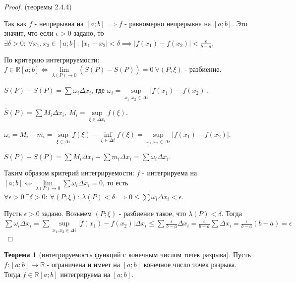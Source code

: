 \documentclass{report}
\theoremstyle{definition}
\newtheorem{theorem}{Теорема}[section]
\begin{document}
\begin{proof}
  (теоремы 2.4.4)

  Так как $f$ - непрерывна на $[a;b]\implies f$ - равномерно непрерывна на $[a;b]$. Это значит,
  что если $\epsilon>0$ задано, то $\exists\delta>0: \ \forall x_{1},x_{2}\in [a;b]: \
    | x_{1} - x_{2} | < \delta \implies | f(x_{1}) - f(x_{2}) | < \frac{\epsilon}{b - a}$.

  По критерию интегрируемости: $f\in\mathbb{R}[a;b] \iff \underset{\lambda(P)\rightarrow0}{\lim}
    (\overline{S}(P) - \underline{S}(P)) = 0 \ \forall (P;\xi)$ - разбиение.

  $\overline{S}(P) - \underline{S}(P) = \sum\omega_{i}\Delta x_{i}$, где $\omega_{i} = \underset
    {x_{1},x_{2}\in\Delta i}{\sup} | f(x_{1}) - f(x_{2}) |$.

  $\overline{S}(P) = \sum M_{i}\Delta x_{i}, \ M_{i} = \underset{\xi\in\Delta x_{i}}{\sup}f(\xi)$.

  $\omega_{i} = M_{i} - m_{i} = \underset{\xi\in\Delta i}{\sup}f(\xi) - \underset{\xi\in\Delta i}
    {\inf}f(\xi) = \underset{x_{1},x_{2}\in\Delta i}{\sup}| f(x_{1}) - f(x_{2}) |$.

  $\overline{S}(P) - \underline{S}(P) = \sum M_{i}\Delta x_{i} - \sum m_{i}\Delta x_{i} =
    \sum \omega_{i}\Delta x_{i}$.

  Таким образом критерий интегрируемости: $f$ - интегрируема на $[a;b] \iff \underset{\lambda
      (P)\rightarrow0}{\lim}\sum\omega_{i}\Delta x_{i} = 0$, то есть $\forall \epsilon > 0 \
    \exists \delta > 0: \ \forall (P;\xi): \ \lambda(P)<\delta\implies 0 \leqslant\sum\omega_{i}
    \Delta x_{i} < \epsilon$.

  Пусть $\epsilon > 0$ задано. Возьмем $(P;\xi)$ - разбиение такое, что $\lambda(P) < \delta$.
  Тогда $\sum\omega_{i}\Delta x_{i} = \sum \underset{x_{1},x_{2}\in\Delta i}{\sup}
    | f(x_{1}) - f(x_{2}) |\Delta x_{i}\leqslant \sum \frac{\epsilon}{b - a} \Delta x_{i} =
    \frac{\epsilon}{b - a}\sum \Delta x_{i} = \frac{\epsilon}{b - a}(b-a) = \epsilon$
\end{proof}

\begin{theorem}[интегрируемость функций с конечным числом точек разрыва]
  Пусть $f:[a;b]\rightarrow\mathbb{R}$ - ограничена и имеет на $[a;b]$ конечное число точек
  разрыва. Тогда $f\in\mathbb{R}[a;b]$ интегрируема на $[a;b]$.
\end{theorem}
\end{document}
